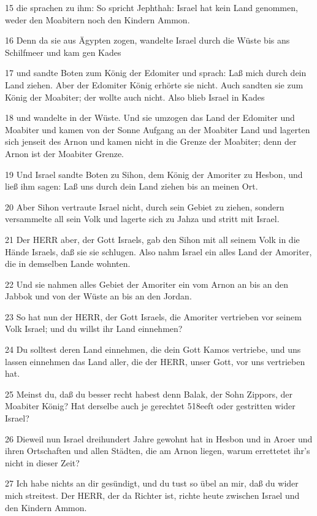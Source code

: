 \par 15 die sprachen zu ihm: So spricht Jephthah: Israel hat kein Land genommen, weder den Moabitern noch den Kindern Ammon.
\par 16 Denn da sie aus Ägypten zogen, wandelte Israel durch die Wüste bis ans Schilfmeer und kam gen Kades
\par 17 und sandte Boten zum König der Edomiter und sprach: Laß mich durch dein Land ziehen. Aber der Edomiter König erhörte sie nicht. Auch sandten sie zum König der Moabiter; der wollte auch nicht. Also blieb Israel in Kades
\par 18 und wandelte in der Wüste. Und sie umzogen das Land der Edomiter und Moabiter und kamen von der Sonne Aufgang an der Moabiter Land und lagerten sich jenseit des Arnon und kamen nicht in die Grenze der Moabiter; denn der Arnon ist der Moabiter Grenze.
\par 19 Und Israel sandte Boten zu Sihon, dem König der Amoriter zu Hesbon, und ließ ihm sagen: Laß uns durch dein Land ziehen bis an meinen Ort.
\par 20 Aber Sihon vertraute Israel nicht, durch sein Gebiet zu ziehen, sondern versammelte all sein Volk und lagerte sich zu Jahza und stritt mit Israel.
\par 21 Der HERR aber, der Gott Israels, gab den Sihon mit all seinem Volk in die Hände Israels, daß sie sie schlugen. Also nahm Israel ein alles Land der Amoriter, die in demselben Lande wohnten.
\par 22 Und sie nahmen alles Gebiet der Amoriter ein vom Arnon an bis an den Jabbok und von der Wüste an bis an den Jordan.
\par 23 So hat nun der HERR, der Gott Israels, die Amoriter vertrieben vor seinem Volk Israel; und du willst ihr Land einnehmen?
\par 24 Du solltest deren Land einnehmen, die dein Gott Kamos vertriebe, und uns lassen einnehmen das Land aller, die der HERR, unser Gott, vor uns vertrieben hat.
\par 25 Meinst du, daß du besser recht habest denn Balak, der Sohn Zippors, der Moabiter König? Hat derselbe auch je gerechtet 518eeft oder gestritten wider Israel?
\par 26 Dieweil nun Israel dreihundert Jahre gewohnt hat in Hesbon und in Aroer und ihren Ortschaften und allen Städten, die am Arnon liegen, warum errettetet ihr's nicht in dieser Zeit?
\par 27 Ich habe nichts an dir gesündigt, und du tust so übel an mir, daß du wider mich streitest. Der HERR, der da Richter ist, richte heute zwischen Israel und den Kindern Ammon.
